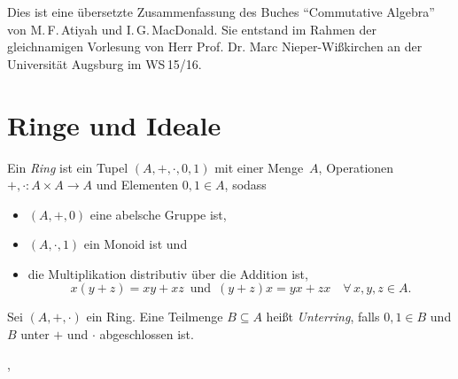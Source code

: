 \documentclass{cheat-sheet}
\begin{document}
\raggedcolumns %


Dies ist eine übersetzte Zusammenfassung des Buches "`Commutative Algebra"' von M.\,F.\,Atiyah und I.\,G.\,MacDonald.
Sie entstand im Rahmen der gleichnamigen Vorlesung von Herr Prof. Dr. Marc Nieper-Wißkirchen an der Universität Augsburg im WS\,15/16.


\section{Ringe und Ideale}



\begin{defn}
  Ein \emph{Ring} ist ein Tupel $(A, +, \cdot, 0, 1)$ mit einer Menge~$A$, Operationen $+, \cdot : A \times A \to A$ und Elementen $0, 1 \in A$, sodass
  \begin{itemize}
    \item $(A, +, 0)$ eine abelsche Gruppe ist,
    \item $(A, \cdot, 1)$ ein Monoid ist und
    \item die Multiplikation distributiv über die Addition ist, \dh{}
    \[
      x (y + z) = x y + x z
      \enspace \text{und} \enspace
      (y + z) x = y x + z x
      \quad \forall \, x, y, z \in A.
    \]
  \end{itemize}
\end{defn}

\begin{bspe}
  \inlineitem{$\Z$,} \enspace
   \enspace
\end{bspe}


\begin{defn}
  Sei $(A, +, \cdot)$ ein Ring.
  Eine Teilmenge $B \subseteq A$ heißt \emph{Unterring}, falls $0, 1 \in B$ und $B$ unter $+$ und $\cdot$ abgeschlossen ist.
\end{defn}

\begin{bspe}
  \inlineitem{$\Z \subset \Q$}, \enspace
\end{bspe}
\end{document}
